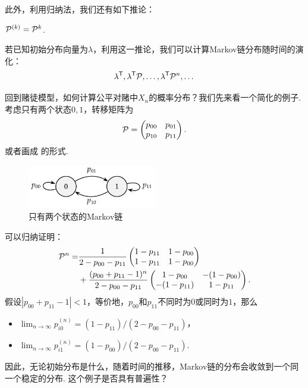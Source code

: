 此外，利用归纳法，我们还有如下推论：
\begin{corollary}\label{cor:kolmogorov-chapman}
    $\mathcal P^{(k)}=\mathcal P^k$.    
\end{corollary}

若已知初始分布向量为$\lambda$，利用这一推论，我们可以计算Markov链分布随时间的演化：
	\[\lambda^{\mathsf{T}},\lambda^{\mathsf{T}} \mathcal P,\dots,\lambda^{\mathsf{T}} \mathcal P^n,\dots\] %

回到赌徒模型，如何计算公平对赌中$X_n$的概率分布？我们先来看一个简化的例子. 考虑只有两个状态$0,1$，转移矩阵为
	\[\mathcal P=\begin{pmatrix}p_{00}&p_{01}\\p_{10}&p_{11}
	\end{pmatrix}.\]
或者画成 的形式.
\begin{figure}
    \centering
    \includegraphics[width=0.5\textwidth]{figures/Markov-chain/simple-example.pdf}
    \caption{只有两个状态的Markov链}
    \label{fig:simple-example}
\end{figure}

可以归纳证明：
\begin{align*}
    \mathcal P^n=&\frac{1}{2-p_{00}-p_{11}}\begin{pmatrix}1-p_{11}&1-p_{00}\\1-p_{11}&1-p_{00}\end{pmatrix}\\
    &+\frac{(p_{00}+p_{11}-1)^n}{2-p_{00}-p_{11}}\begin{pmatrix}1-p_{00}&-(1-p_{00})\\-(1-p_{11})&1-p_{11}\end{pmatrix}.
\end{align*}
假设$|p_{00}+p_{11}-1|<1$，等价地，$p_{00}$和$p_{11}$不同时为$0$或同时为$1$，那么
    \begin{itemize}
        \item $\lim_{n\to\infty}p_{i0}^{(n)}=(1-p_{11})/(2-p_{00}-p_{11})$，
        \item $\lim_{n\to\infty}p_{i1}^{(n)}=(1-p_{00})/(2-p_{00}-p_{11})$.
    \end{itemize}
因此，无论初始分布是什么，随着时间的推移，Markov链的分布会收敛到一个同一个稳定的分布. 这个例子是否具有普遍性？

